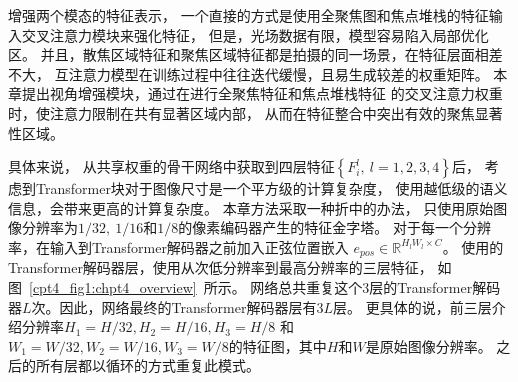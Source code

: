 增强两个模态的特征表示，
一个直接的方式是使用全聚焦图和焦点堆栈的特征输入交叉注意力模块来强化特征，
但是，光场数据有限，模型容易陷入局部优化区。
并且，散焦区域特征和聚焦区域特征都是拍摄的同一场景，在特征层面相差不大，
互注意力模型在训练过程中往往迭代缓慢，且易生成较差的权重矩阵。
本章提出视角增强模块，通过在进行全聚焦特征和焦点堆栈特征
的交叉注意力权重时，使注意力限制在共有显著区域内部，
从而在特征整合中突出有效的聚焦显著性区域。


具体来说，
从共享权重的骨干网络中获取到四层特征$\left \{ F_{i}^{l},~l=1,2,3,4 \right \}$后，
考虑到Transformer块对于图像尺寸是一个平方级的计算复杂度，
使用越低级的语义信息，会带来更高的计算复杂度。
本章方法采取一种折中的办法，
只使用原始图像分辨率为$1/32,~1/16$和$1/8$的像素编码器产生的特征金字塔。
对于每一个分辨率，在输入到Transformer解码器之前加入正弦位置嵌入
$ e_{pos}\in \mathbb{R}^{H_{l}W_{l}\times C} $。
使用的Transformer解码器层，使用从次低分辨率到最高分辨率的三层特征，
如图~\ref{cpt4_fig1:chpt4_overview}~所示。
网络总共重复这个3层的Transformer解码器$L$次。因此，网络最终的Transformer解码器层有$3L$层。
更具体的说，前三层介绍分辨率$H_{1}=H/32,H_{2}=H/16,H_{3}=H/8$
和$W_{1}=W/32,W_{2}=W/16,W_{3}=W/8$的特征图，其中$H$和$W$是原始图像分辨率。
之后的所有层都以循环的方式重复此模式。



